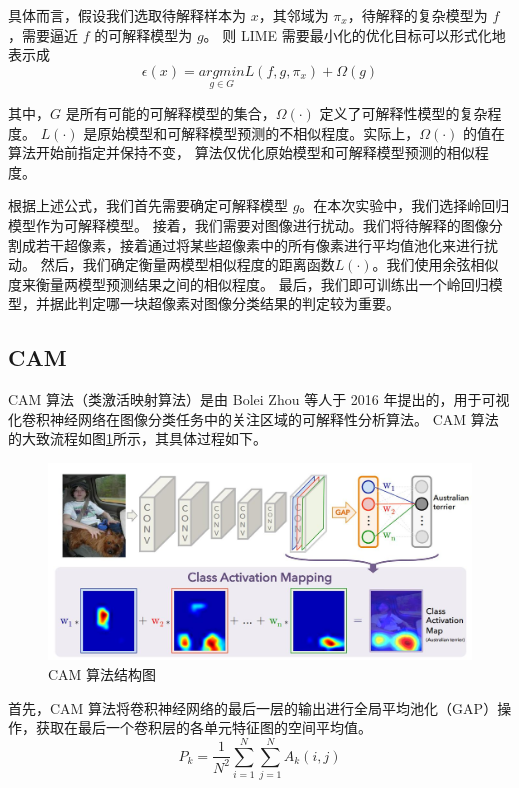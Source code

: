 \documentclass[supercite]{Experimental_Report}
\theoremstyle{definition}
\begin{document}
具体而言，假设我们选取待解释样本为 $x$，其邻域为 $\pi_x$，待解释的复杂模型为 $f$，需要逼近 $f$ 的可解释模型为 $g$。
则 LIME 需要最小化的优化目标可以形式化地表示成
\begin{equation}
	\epsilon(x)=\underset{g\in G}{argmin} L(f, g, \pi_x)+\Omega(g)
\end{equation}

其中，$G$ 是所有可能的可解释模型的集合，$\Omega(\cdot)$ 定义了可解释性模型的复杂程度。
$L(\cdot)$ 是原始模型和可解释模型预测的不相似程度。实际上，$\Omega(\cdot)$ 的值在算法开始前指定并保持不变，
算法仅优化原始模型和可解释模型预测的相似程度。

根据上述公式，我们首先需要确定可解释模型 $g$。在本次实验中，我们选择岭回归模型作为可解释模型。
接着，我们需要对图像进行扰动。我们将待解释的图像分割成若干超像素，接着通过将某些超像素中的所有像素进行平均值池化来进行扰动。
然后，我们确定衡量两模型相似程度的距离函数$L(\cdot)$。我们使用余弦相似度来衡量两模型预测结果之间的相似程度。
最后，我们即可训练出一个岭回归模型，并据此判定哪一块超像素对图像分类结果的判定较为重要。


\subsection{CAM}
CAM 算法（类激活映射算法）\cite{CAM}是由 Bolei Zhou 等人于 2016 年提出的，用于可视化卷积神经网络在图像分类任务中的关注区域的可解释性分析算法。
CAM 算法的大致流程如图\ref{CAM}所示，其具体过程如下。
\begin{figure}[H]
	\begin{center}
		\includegraphics[scale=0.25]{../images/CAM算法结构图.png}
		\caption{CAM 算法结构图}
		\label{CAM}
	\end{center}
\end{figure}

首先，CAM 算法将卷积神经网络的最后一层的输出进行全局平均池化（GAP）操作，获取在最后一个卷积层的各单元特征图的空间平均值。
\begin{equation}
  P_k=\frac{1}{N^2}\sum_{i=1}^{N}\sum_{j=1}^{N}A_k(i, j)
\end{equation}
\end{document}
